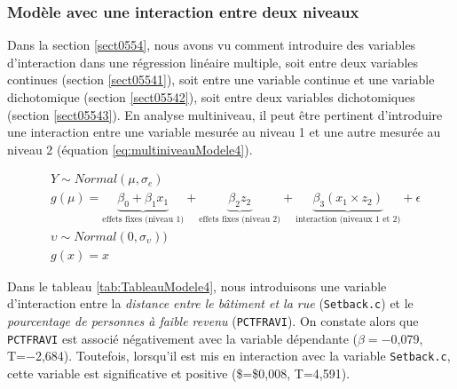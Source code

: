\documentclass[
  11pt,
  french,
]{book}
\begin{document}
\hypertarget{sect08224}{%
\subsubsection{Modèle avec une interaction entre deux niveaux}\label{sect08224}}

Dans la section \ref{sect0554}, nous avons vu comment introduire des variables d'interaction dans une régression linéaire multiple, soit entre deux variables continues (section \ref{sect05541}), soit entre une variable continue et une variable dichotomique (section \ref{sect05542}), soit entre deux variables dichotomiques (section \ref{sect05543}). En analyse multiniveau, il peut être pertinent d'introduire une interaction entre une variable mesurée au niveau 1 et une autre mesurée au niveau 2 (équation \eqref{eq:multiniveauModele4}).

\footnotesize

\begin{equation}
\begin{aligned}
&Y \sim Normal(\mu,\sigma_e)\\
&g(\mu)  = \underbrace{\beta_0 + \beta_1 x_1}_{\mbox{effets fixes (niveau 1)}}+ \underbrace{\beta_2 z_2}_{\mbox{effets fixes (niveau 2)}}+ \underbrace{\beta_3 (x_1 \times z_2)}_{\mbox{interaction (niveaux 1 et 2)}}+ \epsilon \\
&\upsilon \sim Normal(0, \sigma_{\upsilon})) \\
&g(x) = x
\end{aligned}
\label{eq:multiniveauModele4}
\end{equation}
\normalsize

Dans le tableau \ref{tab:TableauModele4}, nous introduisons une variable d'interaction entre la \emph{distance entre le bâtiment et la rue} (\texttt{Setback.c}) et le \emph{pourcentage de personnes à faible revenu} (\texttt{PCTFRAVI}). On constate alors que \texttt{PCTFRAVI} est associé négativement avec la variable dépendante (\(\beta=\)−0,079, T=−2,684). Toutefois, lorsqu'il est mis en interaction avec la variable \texttt{Setback.c}, cette variable est significative et positive (\$\beta=\$0,008, T=4,591).
\end{document}
